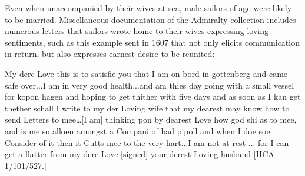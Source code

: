   Even when unaccompanied by their wives at sea, male sailors of age were likely to be married. Miscellaneous documentation of the Admiralty collection includes numerous letters that sailors wrote home to their wives expressing loving sentiments, such as this example sent in 1607 that not only elicits communication in return, but also expresses earnest desire to be reunited:

My dere Love this is to satisfie you that I am on bord in gottenberg and came safe over...I am in very good health...and am thies day going with a small vessel for kopon hagen and hoping to get thither with five days and as soon as I kan get thether schall I write to my der Loving wife that my dearest may know how to send Letters to mee…[I am] thinking pon by dearest Love how god shi as to mee, and is me so alloen amongst a Compani of bad pipoll and when I doe soe Consider of it then it Cutts mee to the very hart...I am not at rest ... for I can get a llatter from my dere Love [signed] your derest Loving husband [HCA 1/101/527.]

